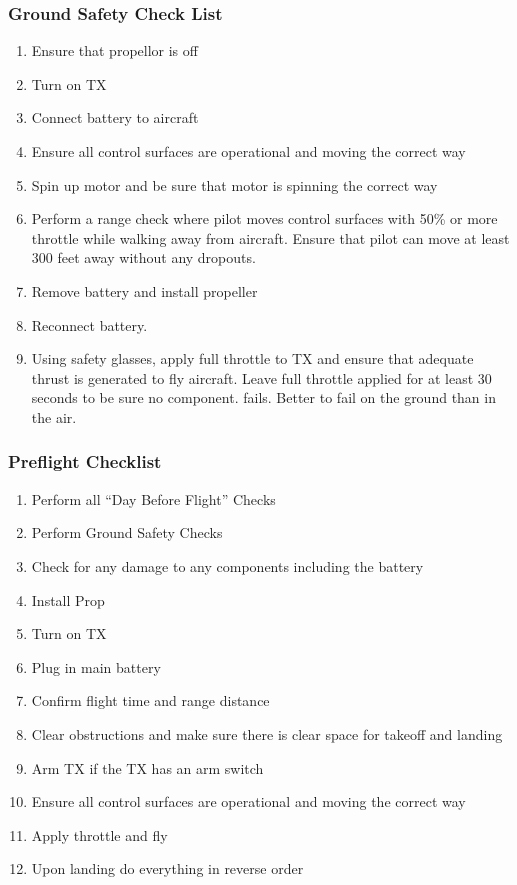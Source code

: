 \documentclass{article}
\begin{document}
\subsubsection{Ground Safety Check List}
\begin{enumerate}[itemsep=-5pt]
  \item Ensure that propellor is off
  \item Turn on TX
  \item Connect battery to aircraft
  \item Ensure all control surfaces are operational and moving the
    correct way
  \item Spin up motor and be sure that motor is spinning the correct
    way
  \item Perform a range check where pilot moves control surfaces with
    50\% or more throttle while walking away from aircraft. Ensure that pilot can move at least
    300 feet away without any dropouts.
  \item Remove battery and install propeller
  \item Reconnect battery.
  \item Using safety glasses, apply full throttle to TX and ensure
    that adequate thrust is generated to fly aircraft. Leave full
    throttle applied for at least 30 seconds to be sure no component. 
    fails. Better to fail on the ground than in the air.
\end{enumerate}

\subsubsection{Preflight Checklist}

\begin{enumerate}[itemsep=-5pt]
\item Perform all “Day Before Flight” Checks
\item Perform Ground Safety Checks
\item Check for any damage to any components including the battery
\item Install Prop
\item Turn on TX
\item Plug in main battery
\item Confirm flight time and range distance
\item Clear obstructions and make sure there is clear space for takeoff and landing
\item Arm TX if the TX has an arm switch
\item Ensure all control surfaces are operational and moving the correct way
\item Apply throttle and fly
\item Upon landing do everything in reverse order
\end{enumerate}
\end{document}
